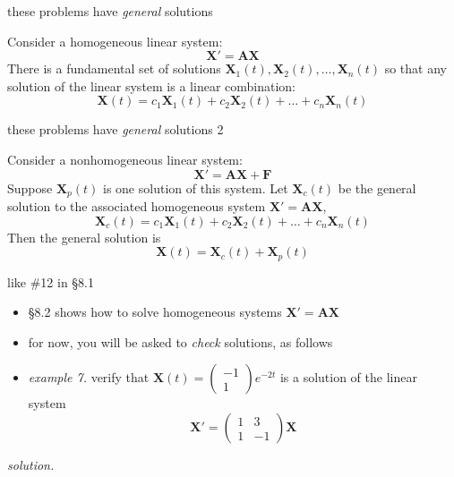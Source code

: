 \documentclass[dvipsnames,colorlinks]{beamer}
\newcommand{\bA}{\mathbf{A}}
\newcommand{\bF}{\mathbf{F}}
\newcommand{\bX}{\mathbf{X}}
\begin{document}
\begin{frame}{these problems have \emph{general} solutions}

\begin{theorem}  Consider a \alert{homogeneous} linear system:
    $$\bX' = \bA \bX$$
There is a \alert{fundamental set} of solutions $\bX_1(t), \bX_2(t), \dots, \bX_n(t)$ so that any solution of the linear system is a linear combination:
    $$\bX(t) = c_1 \bX_1(t) + c_2 \bX_2(t) + \dots + c_n \bX_n(t)$$
\end{theorem}
\end{frame}


\begin{frame}{these problems have \emph{general} solutions 2}

\begin{theorem}  Consider a \alert{non}homogeneous linear system:
    $$\bX' = \bA \bX + \bF$$
Suppose $\bX_p(t)$ is one solution of this system.  Let $\bX_c(t)$ be the general solution to the associated homogeneous system $\bX' = \bA \bX$,
    $$\bX_c(t) = c_1 \bX_1(t) + c_2 \bX_2(t) + \dots + c_n \bX_n(t)$$
Then the general solution is
    $$\bX(t) = \bX_c(t) + \bX_p(t)$$
\end{theorem}
\end{frame}


\begin{frame}{like \#12 in \S8.1}

\begin{itemize}
\item \S8.2 shows how to solve homogeneous systems $\bX' = \bA \bX$
\item for now, you will be asked to \emph{check} solutions, as follows
\item \emph{example 7.}  verify that $\displaystyle \bX(t)=\begin{pmatrix} -1 \\ 1 \end{pmatrix} e^{-2t}$ is a solution of the linear system
    $$\bX' = \begin{pmatrix} 1 & 3 \\ 1 & -1 \end{pmatrix} \bX$$
\end{itemize}

\noindent \emph{solution.}

\vspace{35mm}
\end{frame}
\end{document}

